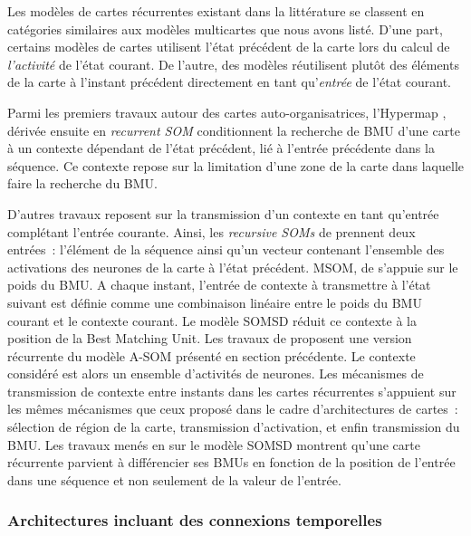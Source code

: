 \documentclass[../main]{subfiles}
\begin{document}
Les modèles de cartes récurrentes existant dans la littérature se classent en catégories similaires aux modèles multicartes que nous avons listé.
D'une part, certains modèles de cartes utilisent l'état précédent de la carte lors du calcul de \emph{l'activité} de l'état courant. De l'autre, des modèles réutilisent plutôt des éléments de la carte à l'instant précédent directement en tant qu'\emph{entrée} de l'état courant.


Parmi les premiers travaux autour des cartes auto-organisatrices, l'Hypermap \cite{Kohonen1991THEHA}, dérivée ensuite en \emph{recurrent SOM} \cite{varsta_temporal_2001} conditionnent la recherche de BMU d'une carte à un contexte dépendant de l'état précédent, lié à l'entrée précédente dans la séquence. Ce contexte repose sur la limitation d'une zone de la carte dans laquelle faire la recherche du BMU. 

D'autres travaux reposent sur la transmission d'un contexte en tant qu'entrée complétant l'entrée courante. 
Ainsi, les \emph{recursive SOMs} de \cite{Voegtlin2002RecursiveSM} prennent deux entrées~: l'élément de la séquence ainsi qu'un vecteur contenant l'ensemble des activations des neurones de la carte à l'état précédent.
MSOM, de \cite{Strickert2005MergeSF} s'appuie sur le poids du BMU. A chaque instant, l'entrée de contexte à transmettre à l'état suivant est définie comme une combinaison linéaire entre le poids du BMU courant et le contexte courant.
Le modèle SOMSD \cite{hagenbuchner_self-organizing_2003, hammer_recursive_2004,hammer_self-organizing_2005, fix20} réduit ce contexte à la position de la Best Matching Unit.
Les travaux de \cite{Buonamente2013SimulatingAW} proposent une version récurrente du modèle A-SOM présenté en section précédente. Le contexte considéré est alors un ensemble d'activités de neurones.
Les mécanismes de transmission de contexte entre instants dans les cartes récurrentes s'appuient sur les mêmes mécanismes que ceux proposé dans le cadre d'architectures de cartes~: sélection de région de la carte, transmission d'activation, et enfin transmission du BMU.
Les travaux menés en \cite{fix20} sur le modèle SOMSD montrent qu'une carte récurrente parvient à différencier ses BMUs en fonction de la position de l'entrée dans une séquence et non seulement de la valeur de l'entrée.

\subsubsection{Architectures incluant des connexions temporelles}
\end{document}
